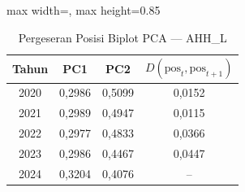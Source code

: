 \begin{table}[H]
\centering
\caption{Pergeseran Posisi Biplot PCA --- AHH\_L} \label{tab:appjarak_pca_loading_ahh_l}
\begin{adjustbox}{max width=\textwidth, max height=0.85\textheight}
\begin{tabular}{|c|c|c|c|}
\hline
\textbf{Tahun} & \textbf{PC1} & \textbf{PC2} & \textbf{$D(\text{pos}_t, \text{pos}_{t+1})$} \\
\hline
2020 & 0,2986 & 0,5099 & 0,0152 \\
2021 & 0,2989 & 0,4947 & 0,0115 \\
2022 & 0,2977 & 0,4833 & 0,0366 \\
2023 & 0,2986 & 0,4467 & 0,0447 \\
2024 & 0,3204 & 0,4076 & -- \\
\hline
\end{tabular}
\end{adjustbox}
\end{table}